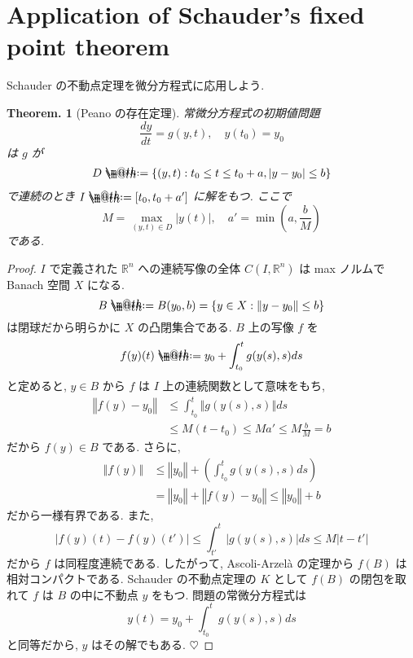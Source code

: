 \documentclass[openany, a4paper, oneside]{book}
\makeatletter
\newcommand*{\defeq}{\mathrel{\rlap{%
\raisebox{0.3ex}{$\m@th\cdot$}}%
\raisebox{-0.3ex}{$\m@th\cdot$}}%
=}
\theoremstyle{break}
\newtheorem{thm}{Theorem.}[section]
\theoremstyle{breakdefn}
\newcommand{\abs}[1]{\left|#1\right|}
\newcommand{\norm}[1]{\left\Vert#1\right\Vert}
\newcommand{\rbk}[1]{\left (#1\right)}
\newcommand{\set}[2]{\left\{#1 : #2\right\}}
\newcommand{\bbRn}{\mathbb{R}^n}
\makeatother
\begin{document}
\section{Application of Schauder's fixed point theorem}
\label{sec-7-5-6}

Schauder の不動点定理を微分方程式に応用しよう.
\begin{thm}[Peano の存在定理]
常微分方程式の初期値問題
\begin{equation}
 \frac{dy}{dt}
 =
 g (y, t), \quad y(t_0) =y_0
\end{equation}
は $g$ が
\begin{align}
 D
 \defeq
 \set{(y, t)}{t_0 \le t \le t_0 + a, |y - y_0| \le b}
\end{align}
で連続のとき $I \defeq [t_0, t_0 + a']$ に解をもつ.
ここで
\begin{equation}
 M = \max_{(y, t) \in D} |y (t)|, \quad a' = \min \rbk{a, \frac{b}{M}}
\end{equation}
である.
\end{thm}
\begin{proof}
$I$ で定義された $\bbRn$ への連続写像の全体 $C (I, \mathbb{R}^n)$ は max ノルムで Banach 空間 $X$ になる.
\begin{equation}
 B
 \defeq
 B (y_0, b)
 =
 \set{y \in X}{\norm{y - y_0} \le b }
\end{equation}
は閉球だから明らかに $X$ の凸閉集合である.
$B$ 上の写像 $f$ を
\begin{equation}
 f(y) (t)
 \defeq
 y_0 + \int_{t_0}^t g (y (s), s) ds
\end{equation}
と定めると, $y \in B$ から $f$ は $I$ 上の連続関数として意味をもち,
\begin{align}
 \norm{f (y) - y_0}
 &\le
 \int_{t_0}^t \norm{g (y (s), s)} ds \\
 &\le
 M (t - t_0)
 \le
 Ma'
 \le
 M\frac{b}{M}
 =
 b
\end{align}
だから $f (y) \in B$ である.
さらに,
\begin{align}
 \norm{f (y)}
 &\le
 \norm{y_0} + \rbk{\int_{t_0}^t g (y (s),s) ds} \\
 &=
 \norm{y_0} + \norm{f (y) - y_0}
 \le
 \norm{y_0} + b
\end{align}
だから一様有界である.
また,
\begin{equation}
 \abs{f (y) (t) - f (y) (t')}
 \le
 \int_{t'}^t \abs{g (y (s), s)} ds
 \le
 M \abs{t - t'}
\end{equation}
だから $f$ は同程度連続である.
したがって, Ascoli-Arzel\`a の定理から $f (B)$ は相対コンパクトである.
Schauder の不動点定理の $K$ として $f (B)$ の閉包を取れて $f$ は $B$ の中に不動点 $y$ をもつ.
問題の常微分方程式は
\begin{equation}
 y (t)
 =
 y_0 + \int_{t_0}^t g (y (s), s) ds
\end{equation}
と同等だから, $y$ はその解でもある.
$\heartsuit$
\end{proof}
\end{document}
